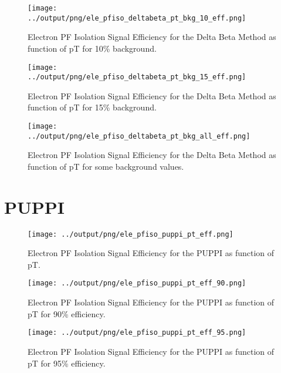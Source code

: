 \documentclass[11pt]{book}
\begin{document}
\begin{figure}[htb]
\centering
\texttt{[image: ../output/png/ele\_pfiso\_deltabeta\_pt\_bkg\_10\_eff.png]}
\caption{Electron PF Isolation Signal Efficiency for the Delta Beta Method as function of pT for 10\% background.}
\label{fig:ele_pfiso_pt_bkg_deltabeta_bkg_10_eff}
\end{figure}

\begin{figure}[htb]
\centering
\texttt{[image: ../output/png/ele\_pfiso\_deltabeta\_pt\_bkg\_15\_eff.png]}
\caption{Electron PF Isolation Signal Efficiency for the Delta Beta Method as function of pT for 15\% background.}
\label{fig:ele_pfiso_pt_bkg_deltabeta_bkg_15_eff}
\end{figure}

\begin{figure}[htb]
\centering
\texttt{[image: ../output/png/ele\_pfiso\_deltabeta\_pt\_bkg\_all\_eff.png]}
\caption{Electron PF Isolation Signal Efficiency for the Delta Beta Method as function of pT for some background values.}
\label{fig:ele_pfiso_pt_bkg_deltabeta_bkg_all_eff}
\end{figure}
\clearpage

\section{PUPPI}
\begin{figure}[htb]
\centering
\texttt{[image: ../output/png/ele\_pfiso\_puppi\_pt\_eff.png]}
\caption{Electron PF Isolation Signal Efficiency for the PUPPI as function of pT.}
\label{fig:ele_pfiso_pt_eff_puppi}
\end{figure}

\begin{figure}[htb]
\centering
\texttt{[image: ../output/png/ele\_pfiso\_puppi\_pt\_eff\_90.png]}
\caption{Electron PF Isolation Signal Efficiency for the PUPPI as function of pT for 90\% efficiency.}
\label{fig:ele_pfiso_pt_eff_puppi_eff_90}
\end{figure}

\begin{figure}[htb]
\centering
\texttt{[image: ../output/png/ele\_pfiso\_puppi\_pt\_eff\_95.png]}
\caption{Electron PF Isolation Signal Efficiency for the PUPPI as function of pT for 95\% efficiency.}
\label{fig:ele_pfiso_pt_eff_puppi_eff_95}
\end{figure}
\end{document}
